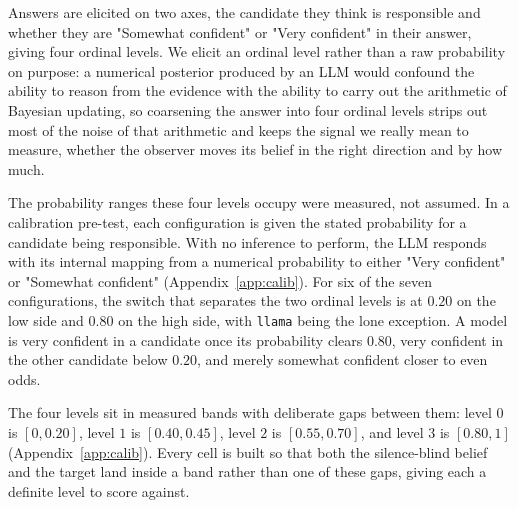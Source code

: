 \documentclass{article}
\theoremstyle{plain}
\theoremstyle{definition}
\theoremstyle{remark}
\begin{document}
Answers are elicited on two axes, the candidate they think is responsible
and whether they are "Somewhat confident" or "Very confident" in their answer,
giving four ordinal levels. We elicit an ordinal level rather than a
raw probability on purpose: a numerical posterior produced by an LLM
would confound the ability to reason from the evidence with the ability to carry
 out the arithmetic of Bayesian updating, so coarsening the answer into four ordinal levels
  strips out most of the noise of that arithmetic and keeps the signal we really mean
   to measure, whether
the observer moves its belief in the right direction and by how much. 


The probability ranges these four levels occupy were measured, not assumed.
In a calibration pre-test, each configuration is given the stated probability for a candidate
being responsible. With no inference to perform, the LLM responds with its internal mapping
from a numerical probability to either "Very confident" or "Somewhat confident" (Appendix~\ref{app:calib}).
For six of the
seven configurations, the switch that separates the two ordinal levels is at $0.20$ on the low side
 and $0.80$ on the
high side, with \texttt{llama} being the lone exception.
A model is very
confident in a candidate once its probability clears $0.80$, very confident
in the other candidate below $0.20$, and merely somewhat confident closer to even
odds.

The four levels sit in measured bands with deliberate gaps between them: level
$0$ is $[0,0.20]$, level $1$ is $[0.40,0.45]$, level $2$ is $[0.55,0.70]$, and
level $3$ is $[0.80,1]$ (Appendix~\ref{app:calib}). Every cell is built
so that both the silence-blind belief and the target land inside a band rather
than one of these gaps, giving each a definite level to score against.
\end{document}
